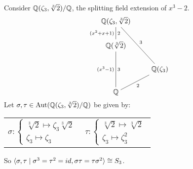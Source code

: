 \documentclass[12pt]{article}
\begin{document}
\eg Consider $\mathbb{Q}(\zeta_3, \sqrt[3]{2})/\mathbb{Q}$, the splitting field extension of $x^3-2$. 
\[\begin{tikzcd}[ampersand replacement=\&,cramped]
	{\mathbb{Q}(\zeta_3,\sqrt[3]2)} \\
	{\mathbb{Q}(\sqrt[3]2)} \\
	\& {\mathbb Q(\zeta_3)} \\
	{\mathbb Q}
	\arrow["2", no head, from=1-1, to=2-1]
	\arrow["3", no head, from=2-1, to=4-1]
	\arrow["3", no head, from=1-1, to=3-2]
	\arrow["2"', no head, from=4-1, to=3-2]
	\arrow["{(x^3-1)}"', draw=none, from=2-1, to=4-1]
	\arrow["{(x^2+x+1)}"', draw=none, from=1-1, to=2-1]
\end{tikzcd}\]
Let $\sigma,\tau \in \operatorname{Aut}(\mathbb{Q}(\zeta_3,\sqrt[3]2)/\mathbb{Q})$ be given by:
\begin{center}
    \begin{tabular}[t]{ll}
        $\sigma: \left\{ \begin{array}{cl}
            \sqrt[3]2 \mapsto \zeta_3 \sqrt[3]2\\
                    \zeta_3 \mapsto \zeta_3
            \end{array} \right.$ 
            & $\tau: \left\{ \begin{array}{cl}
                \sqrt[3]2 \mapsto \sqrt[3]2\\
                        \zeta_3 \mapsto \zeta_3^2
                \end{array} \right.$
    \end{tabular}
\end{center}
So $\langle \sigma,\tau\mid \sigma^3=\tau^2=id, \sigma\tau=\tau\sigma^2 \rangle\cong S_3$.

\end{document}
